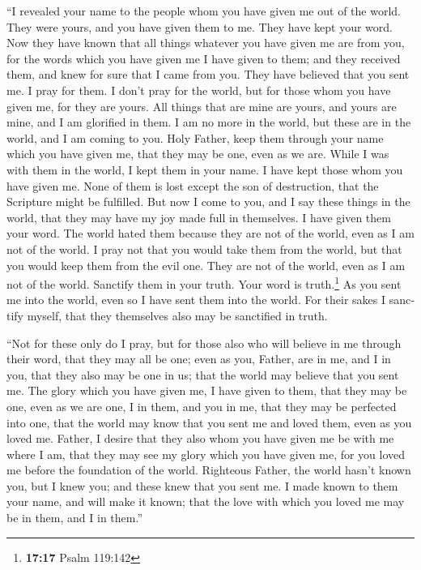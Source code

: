 \begin{paracol}{2}
\begin{otherlanguage}{english}
 ``I revealed your name to the people whom you have given
me out of the world. They were yours, and you have given them to me.
They have kept your word.  Now they have known that all
things whatever you have given me are from you,  for the
words which you have given me I have given to them; and they received
them, and knew for sure that I came from you. They have believed that
you sent me.  I pray for them. I don't pray for the world,
but for those whom you have given me, for they are yours.
 All things that are mine are yours, and yours are mine,
and I am glorified in them.  I am no more in the world,
but these are in the world, and I am coming to you. Holy Father, keep
them through your name which you have given me, that they may be one,
even as we are.  While I was with them in the world, I
kept them in your name. I have kept those whom you have given me. None
of them is lost except the son of destruction, that the Scripture might
be fulfilled.  But now I come to you, and I say these
things in the world, that they may have my joy made full in themselves.
 I have given them your word. The world hated them
because they are not of the world, even as I am not of the world.
 I pray not that you would take them from the world, but
that you would keep them from the evil one.  They are not
of the world, even as I am not of the world.  Sanctify
them in your truth. Your word is truth.\footnote{\textbf{17:17} Psalm
  119:142}  As you sent me into the world, even so I have
sent them into the world.  For their sakes I sanctify
myself, that they themselves also may be sanctified in truth.

 ``Not for these only do I pray, but for those also who
will believe in me through their word,  that they may all
be one; even as you, Father, are in me, and I in you, that they also may
be one in us; that the world may believe that you sent me.
 The glory which you have given me, I have given to them,
that they may be one, even as we are one,  I in them, and
you in me, that they may be perfected into one, that the world may know
that you sent me and loved them, even as you loved me. 
Father, I desire that they also whom you have given me be with me where
I am, that they may see my glory which you have given me, for you loved
me before the foundation of the world.  Righteous Father,
the world hasn't known you, but I knew you; and these knew that you sent
me.  I made known to them your name, and will make it
known; that the love with which you loved me may be in them, and I in
them.''


\end{otherlanguage}
\end{paracol}
